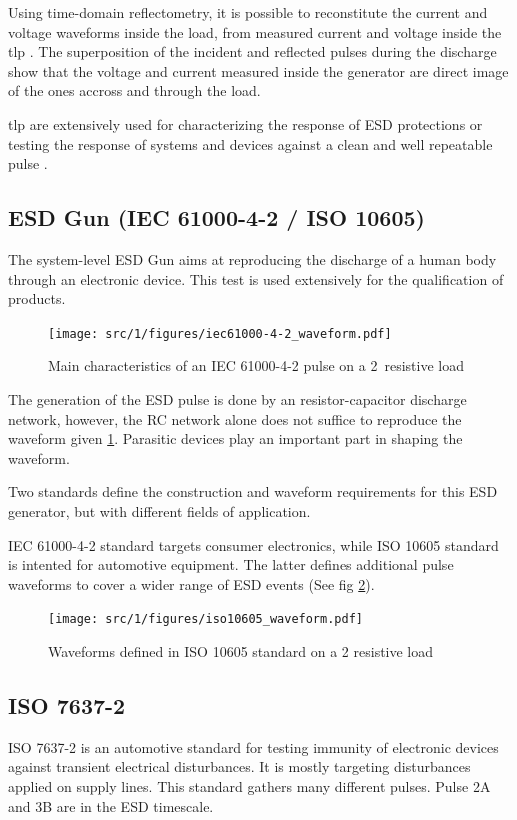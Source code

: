 Using time-domain reflectometry, it is possible to reconstitute the current and voltage waveforms inside the load,
from measured current and voltage inside the \gls{tlp} \cite{TLP}.
The superposition of the incident and reflected pulses during the discharge show that the voltage and current
measured inside the generator are direct image of the ones accross and through the load.

\gls{tlp} are extensively used for characterizing the response of ESD protections \cite{TLPforESDProtectionCz}
or testing the response of systems and devices against a clean and well repeatable pulse \cite{TLPthroubleshooting, LacrampeTransientImmunity}.

\subsection{ESD Gun (IEC 61000-4-2 / ISO 10605)}
The system-level ESD Gun aims at reproducing the discharge of a human body through an electronic device.
This test is used extensively for the qualification of products.

\begin{figure}[!h]
  \centering
  \texttt{[image: src/1/figures/iec61000-4-2\_waveform.pdf]}
  \caption{Main characteristics of an IEC 61000-4-2 pulse on a 2\textOmega\ resistive load}
  \label{iec_pulse}
\end{figure}

The generation of the ESD pulse is done by an resistor-capacitor discharge network, however, the RC network alone does not suffice to reproduce the waveform given \ref{iec_pulse}.
Parasitic devices play an important part in shaping the waveform.

Two standards define the construction and waveform requirements for this ESD generator, but with different fields of application.

IEC 61000-4-2\cite{iec61000-4-2} standard targets consumer electronics, while ISO 10605\cite{iso10605} standard is intented for automotive equipment.
The latter defines additional pulse waveforms to cover a wider range of ESD events (See fig \ref{iso_pulse}).

\begin{figure}[!h]
  \centering
  \texttt{[image: src/1/figures/iso10605\_waveform.pdf]}
  \caption{Waveforms defined in ISO 10605 standard on a 2\textOmega{} resistive load}
  \label{iso_pulse}
\end{figure}


\subsection{ISO 7637-2}
ISO 7637-2\cite{iso7637-2} is an automotive standard for testing immunity of electronic devices against transient electrical disturbances.
It is mostly targeting disturbances applied on supply lines.
This standard gathers many different pulses. Pulse 2A and 3B are in the ESD timescale.

